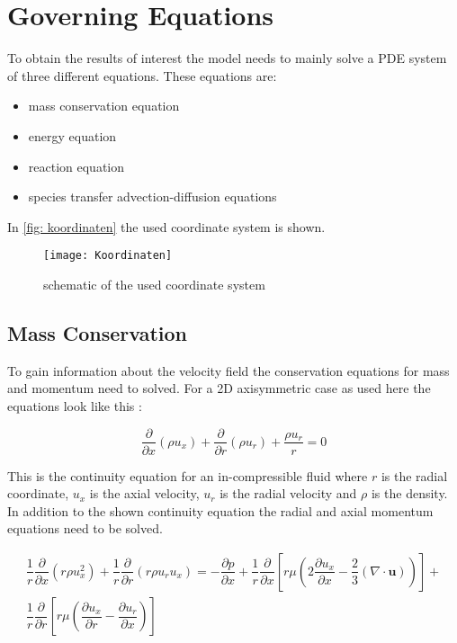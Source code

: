 \documentclass[../thesis.tex]{subfiles}
\begin{document}
\section{Governing Equations}
\label{sec:gov_eqn}
To obtain the results of interest the model needs to mainly solve a PDE system of three different equations. These equations are:
\begin{itemize}
	\item mass conservation equation
	\item energy equation
	\item reaction equation
	\item species transfer advection-diffusion equations
\end{itemize}
In \autoref{fig: koordinaten} the used coordinate system is shown.
\begin{figure}[htb]
	\centering
	\texttt{[image: Koordinaten]}
	\caption{schematic of the used coordinate system}
	\label{fig: koordinaten}
\end{figure}

\subsection{Mass Conservation}
To gain information about the velocity field the conservation equations for mass and momentum need to solved. For a 2D axisymmetric case as used here the equations look like this \cite{manual2009ansys}:

\begin{equation}
\label{eqn:ansys_conti}
\dfrac{\partial}{\partial x} (\rho u_x) + \dfrac{\partial }{\partial r} (\rho u_r)
+ \dfrac{\rho u_r}{r} = 0
\end{equation}

This is the continuity equation for an in-compressible fluid where $r$ is the radial coordinate, $u_x$ is the axial velocity, $u_r$ is the radial velocity and $\rho$ is the density. In addition to the shown continuity equation the radial and axial momentum equations need to be solved.

\begin{gather}
	\dfrac{1}{r} \dfrac{\partial}{\partial x}(r \rho u_x^2)
	+ \dfrac{1}{r} \dfrac{\partial}{\partial r}(r \rho u_r u_x) = 
	- \dfrac{\partial p}{\partial x} + \dfrac{1}{r} \dfrac{\partial }{\partial x} \left[ 
	r \mu \left( 2 \dfrac{\partial u_x}{\partial x} - \dfrac{2}{3}(\nabla \cdot \mathbf{u}) \right)
	\right] + \\ \nonumber
	\dfrac{1}{r} \dfrac{\partial }{\partial r} \left[ 
	r \mu \left( \dfrac{\partial u_x}{\partial r} - \dfrac{\partial u_r}{\partial x} \right)
	\right]	
\end{gather}
\end{document}
